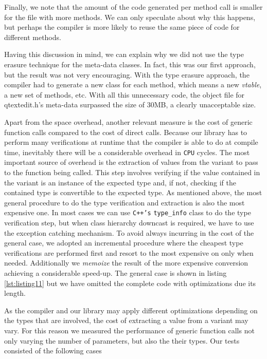 Finally, we note that the amount of the code generated per method call is smaller for the file with more methods. We can only 
speculate about why this happens, but perhaps the compiler is more likely to reuse the same piece of code for
different methods.

Having this discussion in mind, we can explain why we did not use the type erasure technique for the meta-data classes.
In fact, this was our first approach, but the result was not very encouraging. With the type erasure approach, the compiler
had to generate a new class for each method, which means a new \emph{vtable}, a new set of methods, etc. With all this unnecessary
code, the object file for qtextedit.h's meta-data surpassed the size of 30MB, a clearly unacceptable size.

Apart from the space overhead, another relevant measure is the cost of generic function calls compared to the cost of direct calls.
Because our library has to perform many verifications at runtime that the compiler is able to do at compile time, inevitably there will be a
considerable overhead in \texttt{CPU} cycles. The most important source of overhead is the extraction of values from the variant to pass
to the function being called. This step involves verifying if the value contained in the variant is an instance of the expected type and, if not,
checking if the contained type is convertible to the expected type. As mentioned above, the most general procedure to do the type verification
and extraction is also the most expensive one. In most cases we can use \texttt{C++'s} \texttt{type\_info} class to do the type verification
step, but when class hierarchy downcast is required, we have to use the exception catching mechanism.
To avoid always incurring in the cost of the general case, we adopted an incremental procedure where the cheapest type verifications are performed
first and resort to the most expensive on only when needed. Additionally we \emph{memoize} the result of the more expensive conversion
achieving a considerable speed-up. The general case is shown in listing \ref{lst:listing11} but we have omitted the complete code
with optimizations due its length.

As the compiler and our library may apply different optimizations depending on the types that are involved, the cost of extracting a value
from a variant may vary. For this reason we measured the performance of generic function calls not only varying the number of parameters, but
also the their types. Our tests consisted of the following cases

